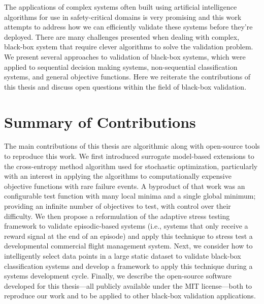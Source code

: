 The applications of complex systems often built using artificial intelligence algorithms for use in safety-critical domains is very promising and this work attempts to address how we can efficiently validate these systems before they're deployed.
There are many challenges presented when dealing with complex, black-box system that require clever algorithms to solve the validation problem.
We present several approaches to validation of black-box systems, which were applied to sequential decision making systems, non-sequential classification systems, and general objective functions.
Here we reiterate the contributions of this thesis and discuss open questions within the field of black-box validation.

\section{Summary of Contributions}\label{sec:summary_of_contributions}

The main contributions of this thesis are algorithmic along with open-source tools to reproduce this work.
We first introduced surrogate model-based extensions to the cross-entropy method algorithm used for stochastic optimization, particularly with an interest in applying the algorithms to computationally expensive objective functions with rare failure events.
A byproduct of that work was an configurable test function with many local minima and a single global minimum; providing an infinite number of objectives to test, with control over their difficulty.
We then propose a reformulation of the adaptive stress testing framework to validate episodic-based systems (i.e., systems that only receive a reward signal at the end of an episode) and apply this technique to stress test a developmental commercial flight management system.
Next, we consider how to intelligently select data points in a large static dataset to validate black-box classification systems and develop a framework to apply this technique during a systems development cycle.
Finally, we describe the open-source software developed for this thesis---all publicly available under the MIT license---both to reproduce our work and to be applied to other black-box validation applications.

